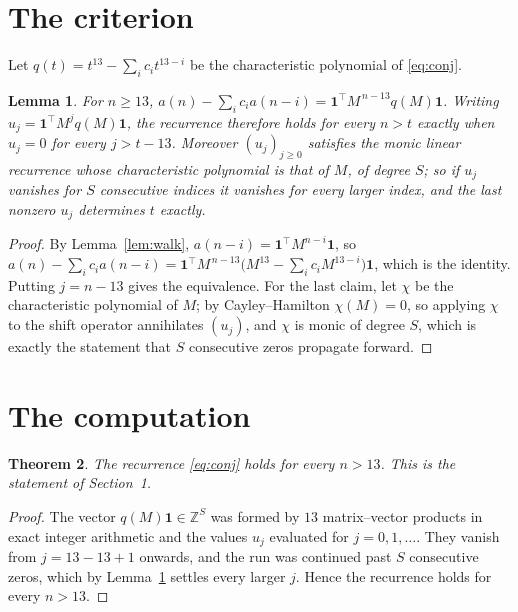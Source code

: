 \documentclass[11pt,a4paper]{article}
\theoremstyle{plain}
\newtheorem{theorem}{Theorem}
\newtheorem{lemma}[theorem]{Lemma}
\theoremstyle{definition}
\begin{document}
\section{The criterion}

Let $q(t)=t^{13}-\sum_i c_i t^{13-i}$ be the characteristic polynomial of
\eqref{eq:conj}.

\begin{lemma}\label{lem:crit}
For $n\ge13$,
$a(n)-\sum_i c_i a(n-i)=\mathbf{1}^{\!\top}M^{\,n-13}q(M)\mathbf{1}$. Writing
$u_j=\mathbf{1}^{\!\top}M^{j}q(M)\mathbf{1}$, the recurrence therefore holds for every
$n>t$ exactly when $u_j=0$ for every $j>t-13$. Moreover $(u_j)_{j\ge0}$ satisfies the
monic linear recurrence whose characteristic polynomial is that of $M$, of degree $S$; so
if $u_j$ vanishes for $S$ consecutive indices it vanishes for every larger index, and the
last nonzero $u_j$ determines $t$ exactly.
\end{lemma}

\begin{proof}
By Lemma~\ref{lem:walk}, $a(n-i)=\mathbf{1}^{\!\top}M^{n-i}\mathbf{1}$, so
$a(n)-\sum_i c_i a(n-i)
=\mathbf{1}^{\!\top}M^{\,n-13}\bigl(M^{13}-\sum_i c_i M^{13-i}\bigr)
\mathbf{1}$, which is the identity. Putting $j=n-13$ gives the equivalence. For the
last claim, let $\chi$ be the characteristic polynomial of $M$; by Cayley--Hamilton
$\chi(M)=0$, so applying $\chi$ to the shift operator annihilates $(u_j)$, and $\chi$ is
monic of degree $S$, which is exactly the statement that $S$ consecutive zeros propagate
forward.
\end{proof}

\section{The computation}

\begin{theorem}
The recurrence \eqref{eq:conj} holds for every $n>13$. This is the statement of
Section~1.
\end{theorem}

\begin{proof}
The vector $q(M)\mathbf{1}\in\mathbb{Z}^{S}$ was formed by $13$ matrix--vector
products in exact integer arithmetic and the values $u_j$ evaluated for
$j=0,1,\dots$. They vanish from $j=13-13+1$ onwards, and the run was continued past
$S$ consecutive zeros, which by Lemma~\ref{lem:crit} settles every larger $j$. Hence the
recurrence holds for every $n>13$.
\end{proof}
\end{document}
